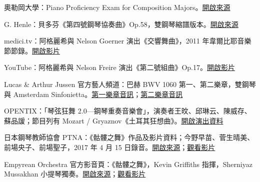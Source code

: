 \documentclass[UTF8,12pt,a4paper,fontset=none]{ctexart}
\begin{document}
\begin{enumerate}[label={[\arabic*]},leftmargin=*,itemsep=6pt,font=\small]
\item 奧勒岡大學：Piano Proficiency Exam for Composition Majors。\href{https://musicanddance.uoregon.edu/piano-proficiency-exam-composition-majors}{開啟來源}

\item G. Henle：貝多芬《第四號鋼琴協奏曲》Op.58，雙鋼琴縮譜版本。\href{https://www.henle.de/Piano-Concerto-no.-4-G-major-op.-58/HN-629}{開啟來源}

\item medici.tv：阿格麗希與 Nelson Goerner 演出《交響舞曲》，2011 年韋爾比耶音樂節節錄。\href{https://vimeo.com/27052613}{開啟影片}

\item YouTube：阿格麗希與 Nelson Freire 演出《第二號組曲》Op.17。\href{https://youtu.be/wYLasmJdeEg}{開啟影片}

\item Lucas \& Arthur Jussen 官方藝人頻道：巴赫 BWV 1060 第一、第二樂章，雙鋼琴與 Amsterdam Sinfonietta。\href{https://youtu.be/DBgV14408Q8}{第一樂章音訊}；\href{https://youtu.be/5ZUCSJfT0Ds}{第二樂章音訊}

\item OPENTIX：「琴弦狂舞 2.0—鋼琴重奏音樂會」，演奏者王旼、邱琳云、陳威存、蘇品諼；節目列有 Mozart / Gryaznov《土耳其狂想曲》。\href{https://www.opentix.life/event/2011709863623639041}{開啟演出資料}

\item 日本鋼琴教師協會 PTNA：《骷髏之舞》作品及影片資料；今野早苗、菅生晴美、前場央子、前場聖子，2017 年 4 月 15 日錄音。\href{https://enc.piano.or.jp/musics/3029}{開啟來源}；\href{https://youtu.be/E2cIH5tMAoA}{觀看影片}

\item Empyrean Orchestra 官方影音頁：《骷髏之舞》，Kevin Griffiths 指揮，Sherniyaz Mussakhan 小提琴獨奏。\href{https://empyreanorchestra.com/en/videos}{開啟來源}；\href{https://youtu.be/LxKQpEVYWog}{觀看影片}

\end{enumerate}
\end{document}
